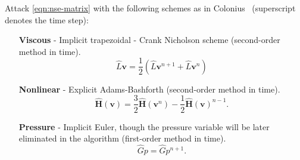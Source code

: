 \documentclass{article}
\begin{document}
Attack \cref{eqn:nse-matrix} with the following schemes as in Colonius~\cite{Colonius:2008} (superscript denotes the time step):
\begin{enumerate}
	\item[\textbf{Viscous}] - Implicit trapezoidal - Crank Nicholson scheme (second-order method in time).  
	\begin{equation}\label{eqn:viscous-crank-nicholson}
  		\hat{L}\boldsymbol{v}=\frac{1}{2}\left(\hat{L}\boldsymbol{v}^{n+1}+\hat{L}\boldsymbol{v}^n\right)
	\end{equation}

	\item[\textbf{Nonlinear}] - Explicit Adams-Bashforth (second-order method in time).
	\begin{equation}\label{eqn:nonlinear-adams-bashforth}
		\mathbf{\hat{H}}(\boldsymbol{v}) = \frac{3}{2}\mathbf{\hat{H}}(\boldsymbol{v}^{n}) - \frac{1}{2}\mathbf{\hat{H}}(\boldsymbol{v})^{n-1}.
	\end{equation}

	\item[\textbf{Pressure}] - Implicit Euler, though the pressure variable will be later eliminated in the algorithm (first-order method in time). 
	\begin{equation}\label{eqn:pressure-implicit-euler} 
		\hat{G}p = \hat{G}p^{n+1}.
	\end{equation}
\end{enumerate}
\end{document}
